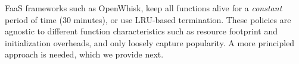 FaaS frameworks such as OpenWhisk, keep all functions alive for a \emph{constant} period of time (30 minutes), or use LRU-based termination. 
%
These policies are agnostic to different function characteristics such as resource footprint and initialization overheads, and only loosely capture popularity. 
%
A more principled approach is needed, which we provide next. 
















